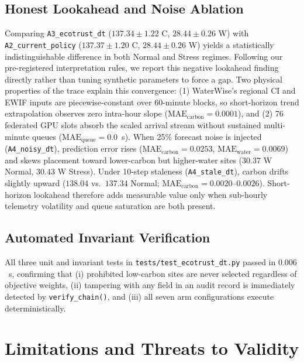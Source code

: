 \documentclass[conference]{IEEEtran}
\begin{document}
\subsection{Honest Lookahead and Noise Ablation}
Comparing \texttt{A3\_ecotrust\_dt} ($137.34 \pm 1.22$ C, $28.44 \pm 0.26$ W) with \texttt{A2\_current\_policy} ($137.37 \pm 1.20$ C, $28.44 \pm 0.26$ W) yields a statistically indistinguishable difference in both Normal and Stress regimes. Following our pre-registered interpretation rules, we report this negative lookahead finding directly rather than tuning synthetic parameters to force a gap. Two physical properties of the trace explain this convergence: (1) WaterWise's regional CI and EWIF inputs are piecewise-constant over 60-minute blocks, so short-horizon trend extrapolation observes zero intra-hour slope ($\mathrm{MAE}_{\mathrm{carbon}} = 0.0001$), and (2) 76 federated GPU slots absorb the scaled arrival stream without sustained multi-minute queues ($\mathrm{MAE}_{\mathrm{queue}} = 0.0$~s). When 25\% forecast noise is injected (\texttt{A4\_noisy\_dt}), prediction error rises ($\mathrm{MAE}_{\mathrm{carbon}} = 0.0253$, $\mathrm{MAE}_{\mathrm{water}} = 0.0069$) and skews placement toward lower-carbon but higher-water sites ($30.37$ W Normal, $30.43$ W Stress). Under 10-step staleness (\texttt{A4\_stale\_dt}), carbon drifts slightly upward ($138.04$ vs.\ $137.34$ Normal; $\mathrm{MAE}_{\mathrm{carbon}} = 0.0020$--$0.0026$). Short-horizon lookahead therefore adds measurable value only when sub-hourly telemetry volatility and queue saturation are both present.

\subsection{Automated Invariant Verification}
All three unit and invariant tests in \texttt{tests/test\_ecotrust\_dt.py} passed in $0.006$~s, confirming that (i) prohibited low-carbon sites are never selected regardless of objective weights, (ii) tampering with any field in an audit record is immediately detected by \texttt{verify\_chain()}, and (iii) all seven arm configurations execute deterministically.

\section{Limitations and Threats to Validity}
\label{sec:limitations}
\end{document}
